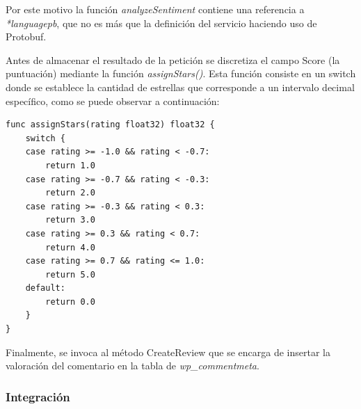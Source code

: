 Por este motivo la función \textit{analyzeSentiment} contiene una referencia a \textit{*languagepb}, que no es más que la definición del servicio haciendo uso de Protobuf.

Antes de almacenar el resultado de la petición se discretiza el campo Score (la puntuación) mediante la función \textit{assignStars()}. Esta función consiste en un switch donde se establece la cantidad de estrellas que corresponde  a un intervalo decimal específico, como se puede observar a continuación:

\begin{lstlisting}[caption= Funci\'on para discretizar la puntuaci\'on de una valoraci\'on]
func assignStars(rating float32) float32 {
	switch {
	case rating >= -1.0 && rating < -0.7:
		return 1.0
	case rating >= -0.7 && rating < -0.3:
		return 2.0
	case rating >= -0.3 && rating < 0.3:
		return 3.0
	case rating >= 0.3 && rating < 0.7:
		return 4.0
	case rating >= 0.7 && rating <= 1.0:
		return 5.0
	default:
		return 0.0
	}
}
\end{lstlisting}
    
Finalmente, se invoca al método CreateReview que se encarga de insertar la valoración del comentario en la tabla de \textit{wp\_commentmeta}.

\newpage

\subsubsection{Integración}

